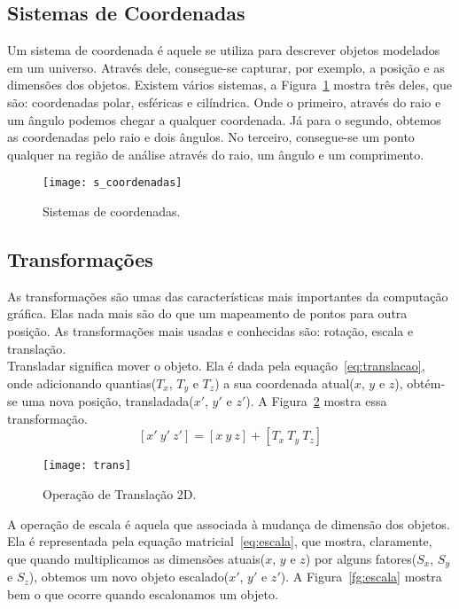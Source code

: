 \subsection{Sistemas de Coordenadas}
Um sistema de coordenada é aquele se utiliza para descrever objetos modelados em um universo. Através dele, consegue-se capturar, por exemplo, a posição e as dimensões dos objetos. Existem vários sistemas, a Figura~\ref{fg:coordenadas} mostra três deles, que são: coordenadas polar, esféricas e cilíndrica. Onde o primeiro, através do raio e um ângulo podemos chegar a qualquer coordenada. Já para o segundo, obtemos as coordenadas pelo raio e dois ângulos. No terceiro, consegue-se um ponto qualquer na região de análise através do raio, um ângulo e um comprimento.\\ 

 \begin{figure}[ht!]
      \centering
	  \texttt{[image: s\_coordenadas]}
	  \caption{Sistemas de coordenadas.}
	  \label{fg:coordenadas}
 \end{figure} 

\subsection{Transformações}
As transformações são umas das características mais importantes da computação gráfica. Elas nada mais são do que um mapeamento de pontos para outra posição\cite{comp_grafica1}. As transformações mais usadas e conhecidas são: rotação, escala e translação.\\

Transladar significa mover o objeto. Ela é dada pela equação~\ref{eq:translacao}, onde adicionando quantias($T_x$, $T_y$ e $T_z$) a sua coordenada atual($x$, $y$ e $z$), obtém-se uma nova posição, transladada($x'$, $y'$ e $z'$). A Figura~\ref{fg:trans} mostra essa transformação. \\

\begin{equation}\label{eq:translacao}
[x'\ y'\ z'] = [x\ y\ z] + [T_{x}\ T_{y}\ T_{z}]
\end{equation}

\begin{figure}[ht!]
      \centering
	  \texttt{[image: trans]}
	  \caption{Operação de Translação 2D.}
	  \label{fg:trans}
\end{figure} 

A operação de escala é aquela que associada à mudança de dimensão dos objetos. Ela é representada pela equação matricial~\ref{eq:escala}, que mostra, claramente, que quando multiplicamos as dimensões atuais($x$, $y$ e $z$) por alguns fatores($S_x$, $S_y$ e $S_z$), obtemos um novo objeto escalado($x'$, $y'$ e $z'$). A Figura~\ref{fg:escala} mostra bem o que ocorre quando escalonamos um objeto.\\

